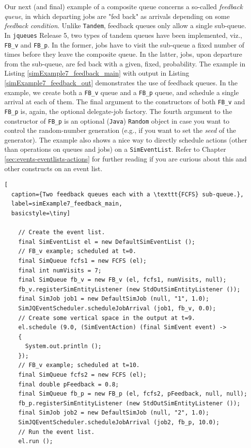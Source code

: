 \documentclass[12pt]{book}
\begin{document}
Our next (and final) example of a composite queue
  concerns a so-called {\em feedback queue},
  in which departing jobs are "fed back"
  as arrivals depending on some {\em feedback condition}.
Unlike \lstinline|Tandem|,
  feedback queues only allow a single sub-queue.
In \lstinline|jqueues| Release 5,
  two types of tandem queues have been implemented,
  viz., \lstinline|FB_v| and \lstinline|FB_p|.
In the former, jobs have to visit the sub-queue a fixed number
  of times before they leave the composite queue.
In the latter, jobs, upon departure from the sub-queue,
  are fed back with a given, fixed, probability.
The example in Listing \ref{simExample7_feedback_main}
  with output in Listing \ref{simExample7_feedback_out}
  demonstrates the use of feedback queues.
In the example,
  we create both a \lstinline|FB_v| queue
  and a \lstinline|FB_p| queue,
  and schedule a single arrival at each of them.
The final argument to the constructors of
  both \lstinline|FB_v| and \lstinline|FB_p|
  is, again, the optional delegate-job factory.
The fourth argument to the constructor of \lstinline|FB_p|
  is an optional (\lstinline|Java|) \lstinline|Random| object
  in case you want to control the random-number generation
  (e.g., if you want to set the {\em seed\/} of the generator).
The example also shows a nice way
  to directly schedule actions
  (other than operations on queues and jobs)
  on a \lstinline|SimEventList|.
Refer to Chapter \ref{sec:events-eventlists-actions} for further reading
  if you are curious about this and other constructs on an event list.

\begin{lstfloat}
\begin{lstlisting}[
  caption={Two feedback queues each with a \texttt{FCFS} sub-queue.},
  label=simExample7_feedback_main,
  basicstyle=\tiny]

    // Create the event list.
    final SimEventList el = new DefaultSimEventList ();
    // FB_v example; scheduled at t=0.
    final SimQueue fcfs1 = new FCFS (el);
    final int numVisits = 7;
    final SimQueue fb_v = new FB_v (el, fcfs1, numVisits, null);
    fb_v.registerSimEntityListener (new StdOutSimEntityListener ());
    final SimJob job1 = new DefaultSimJob (null, "1", 1.0);
    SimJQEventScheduler.scheduleJobArrival (job1, fb_v, 0.0);
    // Create some vertical space in the output at t=9.
    el.schedule (9.0, (SimEventAction) (final SimEvent event) ->
    {
      System.out.println ();
    });
    // FB_v example; scheduled at t=10.
    final SimQueue fcfs2 = new FCFS (el);
    final double pFeedback = 0.8;
    final SimQueue fb_p = new FB_p (el, fcfs2, pFeedback, null, null);
    fb_p.registerSimEntityListener (new StdOutSimEntityListener ());
    final SimJob job2 = new DefaultSimJob (null, "2", 1.0);
    SimJQEventScheduler.scheduleJobArrival (job2, fb_p, 10.0);
    // Run the event list.
    el.run ();

\end{lstlisting}
\end{lstfloat}
\end{document}
